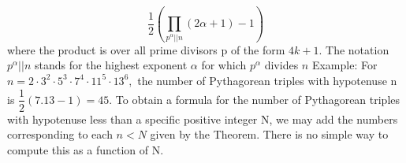 \begin{enumerate}
                \[\displaystyle \dfrac{1}{2}\left( \displaystyle\prod _{ p^{\alpha} || n}\left( 2\alpha +1\right)
                -1\right)\]
                where the product is over all prime divisors p of the form $4k+1$.
                    The notation $\displaystyle p^{\alpha} || n$ stands for the highest exponent $\displaystyle \alpha$
                    for
                    which $\displaystyle p^{\alpha}$ divides $n$
                    Example:
                    For $n = 2\cdot3^{2}\cdot5^{3}\cdot7^{4}\cdot11^{5}\cdot13^{6},$ the number of Pythagorean triples
                    with
                    hypotenuse n is $\displaystyle \dfrac{1}{2}\left( 7.13-1\right) =45$.
                    To obtain a formula for the number of Pythagorean triples with hypotenuse less than a specific
                    positive
                    integer N, we may add the numbers corresponding to each $n < N$ given by the Theorem. There is no
                    simple
                    way to compute this as a function of N.
                

                \end{enumerate}
